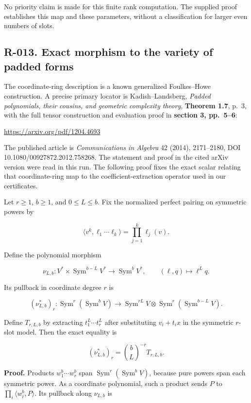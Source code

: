 \documentclass[
  10pt,
]{article}
\begin{document}
No priority claim is made for this finite rank computation. The supplied
proof establishes this map and these parameters, without a
classification for larger even numbers of slots.

\subsection{R-013. Exact morphism to the variety of padded
forms}\label{r-013.-exact-morphism-to-the-variety-of-padded-forms}

The coordinate-ring description is a known generalized Foulkes--Howe
construction. A precise primary locator is Kadish--Landsberg,
\emph{Padded polynomials, their cousins, and geometric complexity
theory}, \textbf{Theorem 1.7}, p.~3, with the full tensor construction
and evaluation proof in \textbf{section 3, pp.~5--6}:

\url{https://arxiv.org/pdf/1204.4693}

The published article is \emph{Communications in Algebra} 42 (2014),
2171--2180, DOI 10.1080/00927872.2012.758268. The statement and proof in
the cited arXiv version were read in this run. The following proof fixes
the exact scalar relating that coordinate-ring map to the
coefficient-extraction operator used in our certificates.

Let \(r\ge1\), \(b\ge1\), and \(0\le L\le b\). Fix the normalized
perfect pairing on symmetric powers by

\[
 \langle v^k,\ell_1\cdots\ell_k\rangle
 =\prod_{j=1}^k\ell_j(v).
\]

Define the polynomial morphism

\[
 \nu_{L,b}:V^*\times\operatorname{Sym}^{b-L}V^*
 \longrightarrow\operatorname{Sym}^bV^*,
 \qquad(\ell,q)\longmapsto\ell^Lq.
\]

Its pullback in coordinate degree \(r\) is

\[
 (\nu_{L,b}^*)_r:
 \operatorname{Sym}^r(\operatorname{Sym}^bV)
 \longrightarrow
 \operatorname{Sym}^{rL}V\otimes
 \operatorname{Sym}^r(\operatorname{Sym}^{b-L}V).
\]

Define \(T_{r,L,b}\) by extracting \(t_1^L\cdots t_r^L\) after
substituting \(v_i+t_ix\) in the symmetric \(r\)-slot model. Then the
exact equality is

\[
 \boxed{\displaystyle
 (\nu_{L,b}^*)_r=\binom bL^{-r}T_{r,L,b}.}
 \tag{R013.1}
\]

\textbf{Proof.} Products \(w_1^b\cdots w_r^b\) span
\(\operatorname{Sym}^r(\operatorname{Sym}^bV)\), because pure powers
span each symmetric power. As a coordinate polynomial, such a product
sends \(P\) to \(\prod_i\langle w_i^b,P\rangle\). Its pullback along
\(\nu_{L,b}\) is
\end{document}
